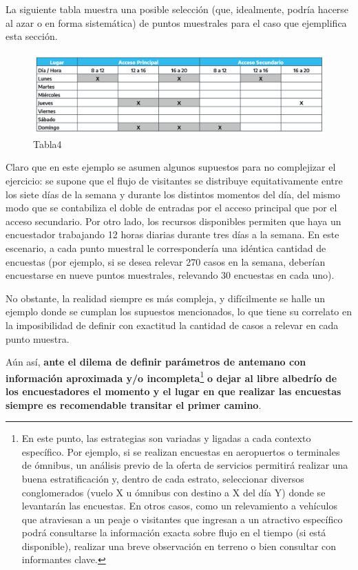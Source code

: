 \documentclass[
]{book}
\begin{document}
La siguiente tabla muestra una posible selección (que, idealmente, podría hacerse al azar o en forma sistemática) de puntos muestrales para el caso que ejemplifica esta sección.

\begin{figure}
\includegraphics[width=1\linewidth]{imagenes/tabla_4} \caption{Tabla4}\label{fig:Muestraposible}
\end{figure}

Claro que en este ejemplo se asumen algunos supuestos para no complejizar el ejercicio: se supone que el flujo de visitantes se distribuye equitativamente entre los siete días de la semana y durante los distintos momentos del día, del mismo modo que se contabiliza el doble de entradas por el acceso principal que por el acceso secundario. Por otro lado, los recursos disponibles permiten que haya un encuestador trabajando 12 horas diarias durante tres días a la semana. En este escenario, a cada punto muestral le correspondería una idéntica cantidad de encuestas (por ejemplo, si se desea relevar 270 casos en la semana, deberían encuestarse en nueve puntos muestrales, relevando 30 encuestas en cada uno).

No obstante, la realidad siempre es más compleja, y difícilmente se halle un ejemplo donde se cumplan los supuestos mencionados, lo que tiene su correlato en la imposibilidad de definir con exactitud la cantidad de casos a relevar en cada punto muestra.

\hfill\break
Aún así, \textbf{ante el dilema de definir parámetros de antemano con información aproximada y/o incompleta}\footnote{En este punto, las estrategias son variadas y ligadas a cada contexto específico. Por ejemplo, si se realizan encuestas en aeropuertos o terminales de ómnibus, un análisis previo de la oferta de servicios permitirá realizar una buena estratificación y, dentro de cada estrato, seleccionar diversos conglomerados (vuelo X u ómnibus con destino a X del día Y) donde se levantarán las encuestas. En otros casos, como un relevamiento a vehículos que atraviesan a un peaje o visitantes que ingresan a un atractivo específico podrá consultarse la información exacta sobre flujo en el tiempo (si está disponible), realizar una breve observación en terreno o bien consultar con informantes clave.} \textbf{o dejar al libre albedrío de los encuestadores el momento y el lugar en que realizar las encuestas siempre es recomendable transitar el primer camino}.
\end{document}

